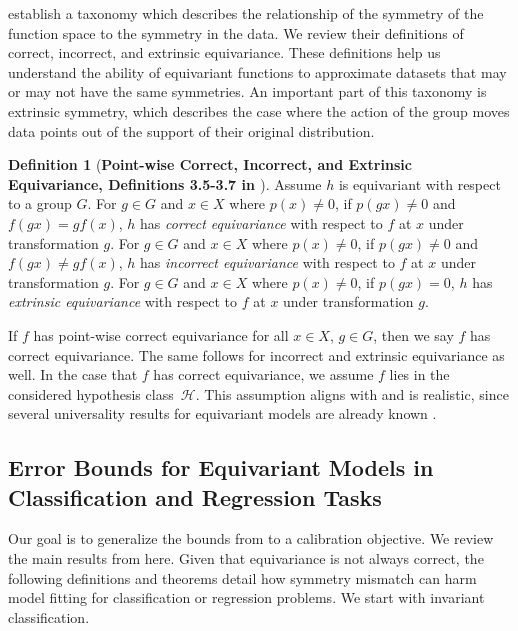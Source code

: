 \documentclass[10pt]{article} %
\newenvironment{customdef}[1][]
{%
    \begin{defn}[\normalfont\textbf{#1}] %
}
{%
    \end{defn}
}
\theoremstyle{definition}
\newtheorem{defn}{Definition}
\begin{document}
\citet{wang2024general} establish a taxonomy which describes the relationship of the symmetry of the function space to the symmetry in the data. We review their definitions of correct, incorrect, and extrinsic equivariance.
These definitions help us understand the ability of equivariant functions to approximate datasets that may or may not have the same symmetries. An important part of this taxonomy is extrinsic symmetry, which describes the case where the action of the group moves data points out of the support of their original distribution.

\begin{customdef}[Point-wise Correct, Incorrect, and Extrinsic Equivariance, Definitions 3.5-3.7 in \cite{wang2024general}] Assume $h$ is equivariant with respect to a group $G$. For $g \in G$ and $x \in X$ where $p(x) \neq 0$, if $p(gx) \neq 0$ and $f(gx) = gf(x)$, $h$ has \textit{correct equivariance} with respect to $f$ at $x$ under transformation $g$. For $g \in G$ and $x \in X$ where $p(x) \neq 0$, if $p(gx) \neq 0$ and $f(gx) \neq gf(x)$, $h$ has \textit{incorrect equivariance} with respect to $f$ at $x$ under transformation $g$. For $g \in G$ and $x \in X$ where $p(x) \neq 0$, if $p(gx) = 0$, $h$ has \textit{extrinsic equivariance} with respect to $f$ at $x$ under transformation $g$.
\end{customdef}

If $f$ has point-wise correct equivariance for all $x \in X$, $g \in G$, then we say $f$ has correct equivariance. The same follows for incorrect and extrinsic equivariance as well. In the case that $f$ has correct equivariance, we assume $f$ lies in the considered hypothesis class~$\mathscr{H}$. This assumption aligns with \cite{wang2024general} and is realistic, since several universality results for equivariant models are already known \citep{yarotsky2022universal}.


\subsection{Error Bounds for Equivariant Models in Classification and Regression Tasks} \label{sec:reg_bounds_wang_old}

Our goal is to generalize the bounds from \cite{wang2024general} to a calibration objective. We review the main results from \cite{wang2024general} here. 
%
Given that equivariance is not always correct, the following definitions and theorems detail how symmetry mismatch can harm model fitting for classification or regression problems. We start with invariant classification.
\end{document}
